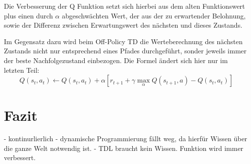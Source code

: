 \documentclass[10pt]{scrartcl}
\begin{document}
Die Verbesserung der Q Funktion setzt sich hierbei aus dem alten Funktionswert plus einen durch $\alpha$ abgeschwächten Wert, der aus der zu erwartender Belohnung, sowie der Differenz zwischen Erwartungswert des nächsten und dieses Zustands.

Im Gegensatz dazu wird beim Off-Policy TD die Werteberechnung des nächsten Zustands nicht nur entsprechend eines Pfades durchgeführt, sonder jeweils immer der beste Nachfolgezustand einbezogen. 
Die Formel ändert sich hier nur im letzten Teil:
\begin{equation}
Q(s_t,a_t) \leftarrow Q(s_t,a_t) + \alpha[r_{t+1}+\gamma  \max_\alpha Q(s_{t+1},a)- Q(s_t,a_t)]
\end{equation}


\section{Fazit}
- kontinurlierlich
- dynamische Programmierung fällt weg, da hierfür Wissen über die ganze Welt notwendig ist.
- TDL braucht kein Wissen. Funktion wird immer verbessert.
\end{document}
